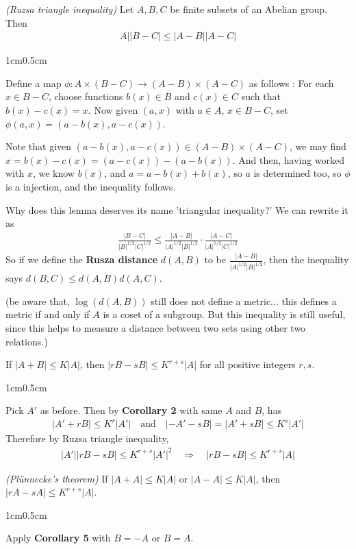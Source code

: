 \documentclass[10pt,a4paper]{report}
\newenvironment{proof}
{\begin{changemargin}{1cm}{0.5cm}
	}%
	{\end{changemargin}
}
\begin{document}
 \emph{(Ruzsa triangle inequality)} Let $A,B,C$ be finite subsets of an Abelian group. Then 
\begin{align*}
A||B-C| \leq |A-B||A-C|
\end{align*}
\begin{proof}
\pf  Define a map $\phi : A \times (B-C) \rightarrow (A-B) \times (A-C)$ as follows : For each $x \in B-C$, choose functions $b(x)\in B$ and $c(x) \in C$ such that $b(x) - c(x) =x$. Now given $(a,x)$ with $a\in A$, $x\in B-C$, set $\phi(a,x) = (a-b(x), a-c(x))$.

\quad Note that given $(a-b(x), a-c(x))\in (A-B)\times (A-C)$, we may find $x = b(x)-c(x) = (a-c(x))- (a-b(x))$. And then, having worked with $x$, we know $b(x)$, and $a = a-b(x)+b(x)$, so $a$ is determined too, so $\phi$ is a injection, and the inequality follows.

\eop
\end{proof}
\s

Why does this lemma deserves its name 'triangular inequality?' We can rewrite it as
\begin{align*}
\frac{|B-C|}{|B|^{1/2} |C|^{1/2}} \leq \frac{|A-B|}{|A|^{1/2}|B|^{1/2}} \cdot \frac{|A-C|}{|A|^{1/2}|C|^{1/2}}
\end{align*}
So if we define the \textbf{Rusza distance} $d(A,B)$ to be $\frac{|A-B|}{|A|^{1/2}|B|^{1/2}}$, then the inequality says $d(B,C) \leq d(A,B)d(A,C)$.

(be aware that, $\log(d(A,B))$ still does not define a metric... this defines a metric if and only if $A$ is a coset of a subgroup. But this inequality is still useful, since this helps to measure a distance between two sets using other two relations.)
\s

 If $|A+B| \leq K|A|$, then $|rB-sB| \leq K^{r+s}|A|$ for all positive integers $r,s$.
\begin{proof}
\pf Pick $A'$ as before. Then by \textbf{Corollary 2} with same $A$ and $B$, has
\begin{align*}
|A'+ rB| \leq K^r |A'| \quad \text{and} \quad |-A'-sB|=|A'+sB|\leq K^s |A'|
\end{align*}
Therefore by Ruzsa triangle inequality,
\begin{align*}
|A'||rB-sB| \leq K^{r+s} |A'|^2 \quad \Rightarrow \quad |rB-sB| \leq K^{r+s}|A|
\end{align*}

\eop
\end{proof}
\s

 \emph{(Pl\"{u}nnecke's theorem)} If $|A+A| \leq K|A|$ or $|A-A| \leq K|A|$, then $|rA-sA| \leq K^{r+s} |A|$.
\begin{proof}
\pf Apply \textbf{Corollary 5} with $B= -A$ or $B=A$.

\eop
\end{proof}
\s
\end{document}
